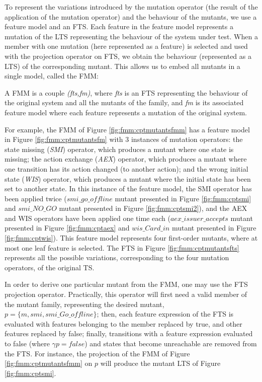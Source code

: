 To represent the variations introduced by the mutation operator (\ie the result of the application of the mutation operator) and the behaviour of the mutants, we use a feature model and an FTS. Each feature in the feature model represents a mutation of the LTS representing the behaviour of the system under test. When a member with one mutation (here represented as a feature) is selected and used with the projection operator on FTS, we obtain the behaviour (represented as a LTS) of the corresponding mutant. This allows us to embed all mutants in a single model, called the \acrfull{FMM}:
%
\begin{definition}
A \gls{FMM} is a couple \textit{(fts,fm)}, where \textit{fts} is an \gls{FTS} representing the behaviour of the original system and all the mutants of the family, and \textit{fm} is its associated \gls{feature model} where each feature represents a mutation of the original system. 
\end{definition}

For example, the FMM of Figure \ref{fig:fmm:cptmutantsfmm} has a feature model in Figure \ref{fig:fmm:cptmutantsfm} with 3 instances of mutation operators: the state missing  (\textit{SMI}) operator, which produces a mutant where one state is missing; the action exchange (\textit{AEX}) operator, which produces a mutant where one transition has its action changed (to another action); and the wrong initial state (\textit{WIS}) operator, which produces a mutant where the initial state has been set to another state. In this instance of the feature model, the SMI operator has been applied twice ($\mathit{smi\_go\_offline}$ mutant presented in Figure \ref{fig:fmm:cptsmi} and $\mathit{smi\_NO\_GO}$ mutant presented in Figure \ref{fig:fmm:cptsmi2}), and the AEX and WIS operators have been applied one time each ($\mathit{aex\_issuer\_accepts}$ mutant presented in Figure \ref{fig:fmm:cptaex} and  $\mathit{wis\_Card\_in}$ mutant presented in Figure \ref{fig:fmm:cptwis}). This feature model represents four first-order mutants, where at most one leaf feature is selected. The FTS in Figure \ref{fig:fmm:cptmutantsfts} represents all the possible variations, corresponding to the four mutation operators, of the original TS.

In order to derive one particular mutant from the FMM, one may use the FTS projection operator. Practically, this operator will first need a valid member of the mutant family, representing the desired mutant, \eg $p = \{m, \mathit{smi}, \mathit{smi\_Go\_offline}\}$; then, each feature expression of the FTS is evaluated with features belonging to the member replaced by true, and other features replaced by false; finally, transitions with a feature expression evaluated to false (\ie where $\gamma p = \mathit{false}$) and states that become unreachable are removed from the FTS. For instance, the projection of the FMM of Figure \ref{fig:fmm:cptmutantsfmm} on $p$ will produce the mutant LTS of Figure \ref{fig:fmm:cptsmi}.

